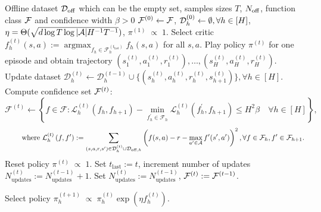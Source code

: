 \begin{algorithm}[h]
    \caption{}
    \begin{algorithmic}[1]
             Offline dataset ${\mathcal{D}}_{{\operatorname{off}}}$ which can be the empty set, samples sizes $T$, $N_{{\operatorname{off}}}$, function class ${\mathcal{F}}$ and confidence width $\beta > 0$ 
             ${\mathcal{F}}^{(0)} \leftarrow {\mathcal{F}}$, ${\mathcal{D}}_h^{(0)}\leftarrow \emptyset, \forall h \in [H]$, $\eta = \Theta(\sqrt{d\log T\log|{\mathcal{A}}| H^{-1}T^{-1}})$, $\pi^{(1)} \; \propto \; 1$.
            \STATE Select critic $f_h^{(t)}(s,a) :=\operatorname{argmax}_{f_h \in \mathcal{F}_h^{(t_{\text{last}})}} f_h\left(s,a\right)$ for all $s,a$.
            \STATE Play policy $\pi^{(t)}$ for one episode and obtain trajectory $(s_1^{(t)}, a_1^{(t)}, r_1^{(t)}), \dots, (s_H^{(t)}, a_H^{(t)}, r_H^{(t)})$.
                \STATE Update dataset $\mathcal{D}_h^{(t)} \leftarrow \mathcal{D}_h^{(t-1)} \cup\{(s_h^{(t)}, a_h^{(t)}, r_h^{(t)}, s_{h+1}^{(t)})\}, \forall h \in[H]$. 
            \STATE Compute confidence set ${\mathcal{F}}^{(t)}$:
            \vspace{-3mm}
            $$
                \mathcal{F}^{(t)} \leftarrow\left\{f \in \mathcal{F}: \mathcal{L}_h^{(t)}\left(f_h, f_{h+1}\right)-\min _{f_h^{\prime} \in \mathcal{F}_h} \mathcal{L}_h^{(t)}\left(f_h^{\prime}, f_{h+1}\right) \leq H^2\beta \quad \forall h \in[H]\right\},
            $$
            $$ \qquad \text{ where } \mathcal{L}_h^{(t)}\left(f, f'\right):=\sum_{\left(s, a, r, s^{\prime}\right) \in \mathcal{D}_h^{(t)} \cup \mathcal{D}_{{\operatorname{off}}, h}}\left(f(s, a)-r-\max_{a' \in {\mathcal{A}}} f^{\prime}(s^{\prime}, a')\right)^2, \forall f \in {\mathcal{F}}_{h}, f' \in \mathcal{F}_{h+1}.
            $$
            \STATE Reset policy $\pi^{(t)} \; \propto \; 1$. 
            \STATE Set $t_{\text{last}} := t$, increment number of updates $N_{\text{updates}}^{(t)} := N_{\text{updates}}^{(t-1)}+ 1$.
            \ELSE
            \STATE Set $N_{\text{updates}}^{(t)} := N_{\text{updates}}^{(t-1)}$, ${\mathcal{F}}^{(t)} := {\mathcal{F}}^{(t-1)}$.
            \ENDIF
           
        \STATE Select policy $\pi_h^{(t+1)} \; \propto \; \pi_h^{(t)}\exp(\eta f_h^{(t)})$.
        \ENDFOR
    \end{algorithmic}
\label{alg:NORA-long}
\end{algorithm}
